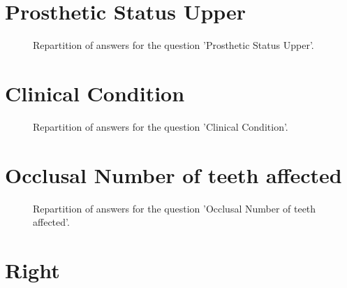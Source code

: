 \documentclass[12pt]{article}
\begin{document}
\clearpage{}
\section{Prosthetic Status
Upper}

\label{sec:69}


\begin{figure}[h!]
    \caption{\label{figure:q69-1}Repartition of answers for the question 'Prosthetic Status
Upper'.}
\end{figure}



\clearpage{}
\section{Clinical Condition}

\label{sec:168}


\begin{figure}[h!]
    \caption{\label{figure:q168-1}Repartition of answers for the question 'Clinical Condition'.}
\end{figure}



\clearpage{}
\section{Occlusal
Number of teeth affected}

\label{sec:174}


\begin{figure}[h!]
    \caption{\label{figure:q174-1}Repartition of answers for the question 'Occlusal
Number of teeth affected'.}
\end{figure}



\clearpage{}
\section{Right}
\end{document}
